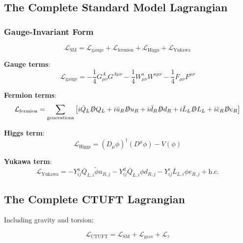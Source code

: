 \subsection{The Complete Standard Model Lagrangian}

\subsubsection{Gauge-Invariant Form}

\begin{equation}
    \mathcal{L}_{\text{SM}} = \mathcal{L}_{\text{gauge}} + \mathcal{L}_{\text{fermion}} + \mathcal{L}_{\text{Higgs}} + \mathcal{L}_{\text{Yukawa}}
\end{equation}

\textbf{Gauge terms}:
\begin{equation}
    \mathcal{L}_{\text{gauge}} = -\frac{1}{4}G_{\mu\nu}^A G^{A\mu\nu} - \frac{1}{4}W_{\mu\nu}^a W^{a\mu\nu} - \frac{1}{4}F_{\mu\nu}F^{\mu\nu}
\end{equation}

\textbf{Fermion terms}:
\begin{equation}
    \mathcal{L}_{\text{fermion}} = \sum_{\text{generations}} \left[ i\bar{Q}_L \slashed{D} Q_L + i\bar{u}_R \slashed{D} u_R + i\bar{d}_R \slashed{D} d_R + i\bar{L}_L \slashed{D} L_L + i\bar{e}_R \slashed{D} e_R \right]
\end{equation}

\textbf{Higgs term}:
\begin{equation}
    \mathcal{L}_{\text{Higgs}} = (D_\mu \phi)^\dagger(D^\mu \phi) - V(\phi)
\end{equation}

\textbf{Yukawa term}:
\begin{equation}
    \mathcal{L}_{\text{Yukawa}} = -Y_{ij}^u \bar{Q}_{L,i} \tilde{\phi} u_{R,j} - Y_{ij}^d \bar{Q}_{L,i} \phi d_{R,j} - Y_{ij}^e \bar{L}_{L,i} \phi e_{R,j} + \text{h.c.}
\end{equation}

\subsection{The Complete CTUFT Lagrangian}

Including gravity and torsion:

\begin{equation}
    \mathcal{L}_{\text{CTUFT}} = \mathcal{L}_{\text{SM}} + \mathcal{L}_{\text{grav}} + \mathcal{L}_{\tau}
\end{equation}

